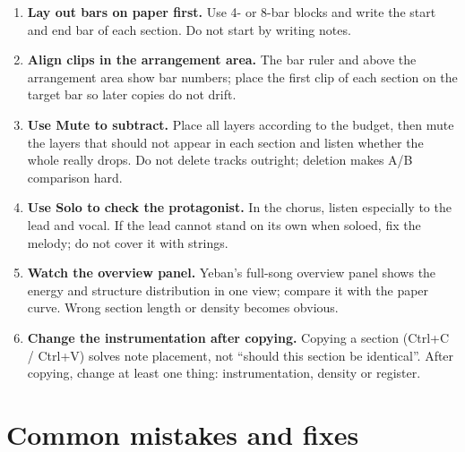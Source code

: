 \begin{enumerate}
\item \textbf{Lay out bars on paper first.} Use 4- or 8-bar blocks and write the start and end bar of each section. Do not start by writing notes.
\item \textbf{Align clips in the arrangement area.} The bar ruler and  above the arrangement area show bar numbers; place the first clip of each section on the target bar so later copies do not drift.
\item \textbf{Use Mute to subtract.} Place all layers according to the budget, then mute the layers that should not appear in each section and listen whether the whole really drops. Do not delete tracks outright; deletion makes A/B comparison hard.
\item \textbf{Use Solo to check the protagonist.} In the chorus, listen especially to the lead and vocal. If the lead cannot stand on its own when soloed, fix the melody; do not cover it with strings.
\item \textbf{Watch the overview panel.} Yeban's full-song overview panel shows the energy and structure distribution in one view; compare it with the paper curve. Wrong section length or density becomes obvious.
\item \textbf{Change the instrumentation after copying.} Copying a section (Ctrl+C / Ctrl+V) solves note placement, not ``should this section be identical''. After copying, change at least one thing: instrumentation, density or register.
\end{enumerate}


\section{Common mistakes and fixes}
\label{sec:structure-mistakes}

